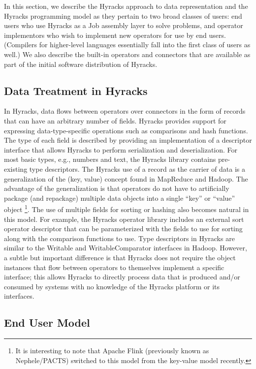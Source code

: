 In this section, we describe the Hyracks approach to data representation and the Hyracks programming model as they pertain to two broad classes of users:
end users who use Hyracks as a Job assembly layer to solve problems, and operator implementors who wish to implement new operators for use by end users.
(Compilers for higher-level languages essentially fall into the first class of users as well.)
We also describe the built-in operators and connectors that are available as part of the initial software distribution of Hyracks.

\subsection{Data Treatment in Hyracks}

In Hyracks, data flows between operators over connectors in the form of records that can have an arbitrary number of fields.
Hyracks provides support for expressing data-type-specific operations such as comparisons and hash functions.
The type of each field is described by providing an implementation of a descriptor interface that allows Hyracks to perform serialization and deserialization.
For most basic types, e.g., numbers and text, the Hyracks library contains pre-existing type descriptors.
The Hyracks use of a record as the carrier of data is a generalization of the (key, value) concept found in MapReduce and Hadoop.
The advantage of the generalization is that operators do not have to artificially package (and repackage) multiple data objects into a single ``key'' or ``value'' object \footnote{It is interesting to note that Apache Flink (previously known as Nephele/PACTS) switched to this model from the key-value model recently.}.
The use of multiple fields for sorting or hashing also becomes natural in this model.
For example, the Hyracks operator library includes an external sort operator descriptor
that can be parameterized with the fields to use for sorting along with the comparison functions to use.
Type descriptors in Hyracks are similar to the Writable and WritableComparator interfaces in Hadoop.
However, a subtle but important difference is that Hyracks does not require the object instances that flow between operators to themselves implement a specific interface;
this allows Hyracks to directly process data that is produced and/or consumed by systems with no knowledge of the Hyracks platform or its interfaces.

\subsection{End User Model}

